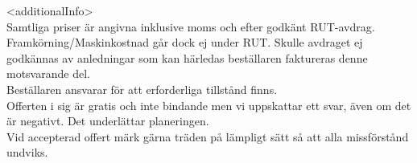 \documentclass[a4paper,11pt]{extarticle}
\newcommand{\changefont}{%
        \fontsize{9}{11}\selectfont
    }
\begin{document}
\renewcommand\arraystretch{1}

\vspace{2em}
<additionalInfo> \\

Samtliga priser är angivna inklusive moms och efter godkänt RUT-avdrag. Framkörning/Maskinkostnad går dock ej under RUT. Skulle avdraget ej godkännas av anledningar som kan härledas beställaren faktureras denne motsvarande del. \\

Beställaren ansvarar för att erforderliga tillstånd finns. \\

Offerten i sig är gratis och inte bindande men vi uppskattar ett svar, även om det är negativt. Det underlättar planeringen. \\

Vid accepterad offert märk gärna träden på lämpligt sätt så att alla missförstånd undviks.

\end{document}
